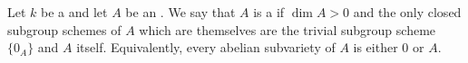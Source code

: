 \begin{definition} \label{definition:simple_abelian_variety_over_a_field}
    Let $k$ be a  and let $A$ be an . We say that $A$ is a  if $\dim A > 0$ and the only closed subgroup schemes of $A$ which are themselves  are the trivial subgroup scheme $\{0_A\}$ and $A$ itself. Equivalently, every abelian subvariety of $A$ is either $0$ or $A$.
\end{definition}
